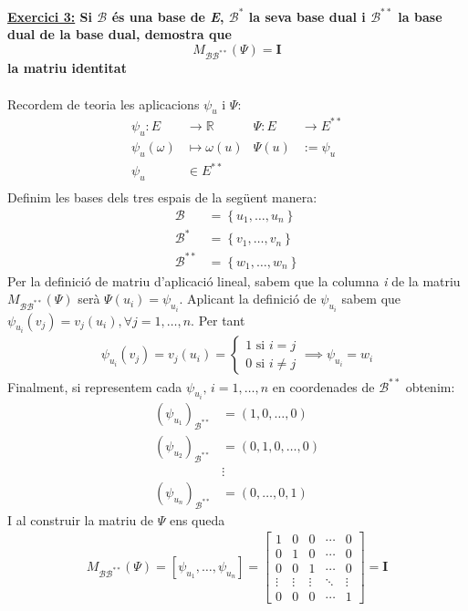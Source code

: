 \documentclass[a4paper, 11pt]{article}
\begin{document}
    \noindent\textbf{ \large \underline{Exercici 3:}
    \normalsize
    Si $\mathcal{B}$ \'es una base de \emph{E}, $\mathcal{B}^*$ la seva base dual i $\mathcal{B}^{**}$ la base dual de la base dual, demostra que
    $$
        M_{\mathcal{B}\mathcal{B}^{**}}(\Psi) = \mathbf{I}
    $$
    la matriu identitat
    }\\\\
    Recordem de teoria les aplicacions $\psi_u$ i $\Psi$:
    \begin{align*}
        \psi_u: E &\longrightarrow \mathbb{R} & \Psi: E &\longrightarrow E^{**}\\
        \psi_u(\omega) &\mapsto \omega(u) & \Psi(u) &:= \psi_u\\
        \psi_u &\in E^{**}\\
    \end{align*}
    Definim les bases dels tres espais de la seg\"uent manera:
    \begin{align*}
        \mathcal{B} &= \left\{ u_1,\dots,u_n \right\}\\
        \mathcal{B}^* &= \left\{ v_1,\dots,v_n \right\}\\
        \mathcal{B}^{**} &= \left\{ w_1,\dots,w_n \right\}
    \end{align*}
    Per la definici\'o de matriu d'aplicaci\'o lineal, sabem que la columna \emph{i} de la matriu $ M_{\mathcal{B}\mathcal{B}^{**}}(\Psi) $ ser\`a $ \Psi(u_i) = \psi_{u_i} $. Aplicant la definici\'o de $ \psi_{u_i} $ sabem que $ \psi_{u_i}(v_j) = v_j(u_i), \forall j=1,\dots,n $. Per tant
    \begin{gather*}
        \psi_{u_i}(v_j) = v_j(u_i) = 
        \begin{cases}
            1 \text{ si } i = j\\
            0 \text{ si } i \neq j
        \end{cases}
        \implies \psi_{u_i} = w_i
    \end{gather*}
    Finalment, si representem cada $ \psi_{u_i} \text{, } i = 1,\dots,n $ en coordenades de $ \mathcal{B}^{**} $ obtenim:
    \begin{align*}
        (\psi_{u_1})_{\mathcal{B}^{**}} &= (1, 0, \dots, 0)\\
        (\psi_{u_2})_{\mathcal{B}^{**}} &= (0, 1, 0, \dots, 0)\\
        &\vdots\\
        (\psi_{u_n})_{\mathcal{B}^{**}} &= (0, \dots, 0, 1)
    \end{align*}
    I al construir la matriu de $ \Psi $ ens queda
    \begin{gather*}
        M_{\mathcal{B}\mathcal{B}^{**}}(\Psi) = \left[ \psi_{u_1}, \dots, \psi_{u_n} \right] =
        \begin{bmatrix}
            1 & 0 & 0 & \cdots & 0 \\
            0 & 1 & 0 & \cdots & 0 \\
            0 & 0 & 1 & \cdots & 0 \\
            \vdots & \vdots & \vdots & \ddots & \vdots \\
            0 & 0 & 0 & \cdots & 1
        \end{bmatrix}
        = \mathbf{I} 
    \end{gather*}
\end{document}
